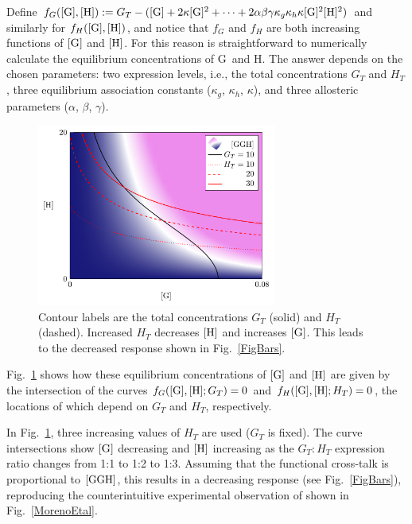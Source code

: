 \documentclass[12pt]{article}
\def\Fig#1{Fig.~\ref{#1}}
\def\G{{\rm G}}
\def\H{{\rm H}}
\def\GGH{{\rm GGH}}
\def\g{[\G]}
\def\h{[\H]}
\def\ggh{[\GGH]}
\def\gtot{G_T}
\def\htot{H_T}
\begin{document}
Define $f_G(\g,\h) := \gtot - ( \g + 2\kappa \g^2 + \cdots + 2 \alpha \beta \gamma \kappa_g \kappa_h \kappa \g^2\h^2 ) $
and similarly for $f_H(\g,\h)$, and notice that $f_G$ and $f_H$ are both increasing functions of $\g$ and $\h$.  For this reason is straightforward to numerically calculate the equilibrium concentrations of \G\ and \H.  The answer depends on the chosen parameters:   two expression levels, i.e., the total concentrations $\gtot$ and $\htot$,  three equilibrium association constants ($\kappa_g$, $\kappa_h$, $\kappa$), and three allosteric parameters ($\alpha$, $\beta$, $\gamma$).   

\begin{figure}
    \centering
    \includegraphics[width=0.7\textwidth]{FigGHRatioStudyLoci.pdf}
    \caption{Contour labels are the total concentrations $\gtot$ (solid) and $\htot$ (dashed). Increased $\htot$  decreases  $\h$ and increases $\g$.  This leads to the decreased response shown in \Fig{FigBars}.}
    \label{FigContours}
\end{figure}

 \Fig{FigContours} shows how these equilibrium concentrations of $\g$ and $\h$ are given by the intersection of the curves $f_G(\g,\h; \gtot)=0$ and   $f_H(\g,\h; \htot)=0$, the locations of which depend on $\gtot$ and $\htot$, respectively.  

In \Fig{FigContours},  three increasing values of $\htot$ are used ($\gtot$ is fixed).  The curve intersections show $\g$ decreasing and $\h$ increasing as the $\gtot:\htot$ expression ratio changes from 1:1 to 1:2 to 1:3.  Assuming that the functional cross-talk is proportional to $\ggh$, this results in a decreasing response (see  \Fig{FigBars}), reproducing the counterintuitive experimental observation of \cite{MorenoEtal16}  shown in \Fig{MorenoEtal}.

\end{document}
